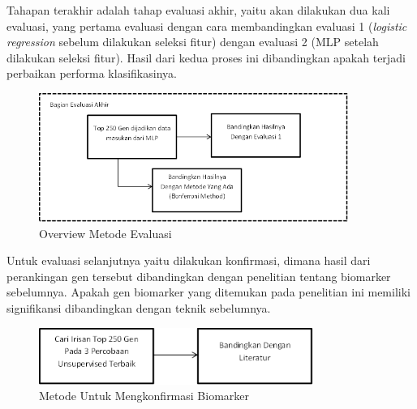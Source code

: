 Tahapan terakhir adalah tahap evaluasi akhir, yaitu  akan dilakukan dua kali evaluasi, yang pertama evaluasi  dengan cara membandingkan evaluasi 1 (\textit{logistic regression} sebelum dilakukan seleksi fitur) dengan evaluasi 2 (MLP setelah dilakukan seleksi fitur). Hasil dari kedua proses ini dibandingkan apakah terjadi perbaikan performa klasifikasinya. \\
\begin{figure}
	\centering
	\includegraphics[width=0.9\textwidth]
		{pics/evaluasi2.png}
	\caption{Overview Metode Evaluasi}
	\label{fig:evaluasi2}
\end{figure}
Untuk evaluasi selanjutnya yaitu dilakukan konfirmasi, dimana hasil dari perankingan gen tersebut dibandingkan dengan penelitian tentang biomarker sebelumnya. Apakah gen biomarker yang ditemukan pada penelitian ini memiliki signifikansi dibandingkan dengan teknik sebelumnya.\\
\begin{figure}
	\centering
	\includegraphics[width=0.8\textwidth]
		{pics/evaluasi3.png}
	\caption{Metode Untuk Mengkonfirmasi Biomarker}
	\label{fig:evaluasi2}
\end{figure}

